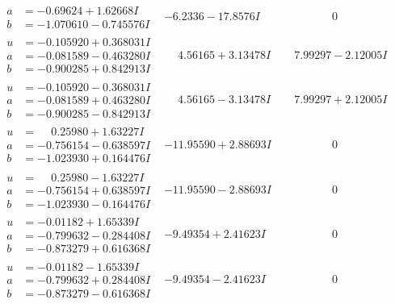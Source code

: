 \documentclass[1p]{elsarticle_modified}
\theoremstyle{definition}
\begin{document}
$$\begin{array}{c|c|c}
\begin{aligned}
a &= -0.69624 + 1.62668 I \\
b &= -1.070610 - 0.745576 I\end{aligned}
 & -6.2336 - 17.8576 I & \phantom{-0.000000 } 0 \\ \hline\begin{aligned}
u &= -0.105920 + 0.368031 I \\
a &= -0.081589 - 0.463280 I \\
b &= -0.900285 + 0.842913 I\end{aligned}
 & \phantom{-}4.56165 + 3.13478 I & \phantom{-}7.99297 - 2.12005 I \\ \hline\begin{aligned}
u &= -0.105920 - 0.368031 I \\
a &= -0.081589 + 0.463280 I \\
b &= -0.900285 - 0.842913 I\end{aligned}
 & \phantom{-}4.56165 - 3.13478 I & \phantom{-}7.99297 + 2.12005 I \\ \hline\begin{aligned}
u &= \phantom{-}0.25980 + 1.63227 I \\
a &= -0.756154 - 0.638597 I \\
b &= -1.023930 + 0.164476 I\end{aligned}
 & -11.95590 + 2.88693 I & \phantom{-0.000000 } 0 \\ \hline\begin{aligned}
u &= \phantom{-}0.25980 - 1.63227 I \\
a &= -0.756154 + 0.638597 I \\
b &= -1.023930 - 0.164476 I\end{aligned}
 & -11.95590 - 2.88693 I & \phantom{-0.000000 } 0 \\ \hline\begin{aligned}
u &= -0.01182 + 1.65339 I \\
a &= -0.799632 - 0.284408 I \\
b &= -0.873279 + 0.616368 I\end{aligned}
 & -9.49354 + 2.41623 I & \phantom{-0.000000 } 0 \\ \hline\begin{aligned}
u &= -0.01182 - 1.65339 I \\
a &= -0.799632 + 0.284408 I \\
b &= -0.873279 - 0.616368 I\end{aligned}
 & -9.49354 - 2.41623 I & \phantom{-0.000000 } 0 \\ \hline\begin{aligned}

\end{aligned}
\end{array}$$
\end{document}
